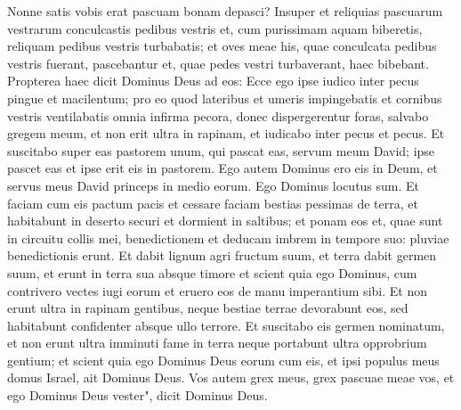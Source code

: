 \begin{biblechapter}
\verse Nonne satis vobis erat pascuam bonam depasci? Insuper et reliquias pascuarum vestrarum conculcastis pedibus vestris et, cum purissimam aquam biberetis, reliquam pedibus vestris turbabatis; 
\verse et oves meae his, quae conculcata pedibus vestris fuerant, pascebantur et, quae pedes vestri turbaverant, haec bibebant. 
\verse Propterea haec dicit Dominus Deus ad eos: Ecce ego ipse iudico inter pecus pingue et macilentum; 
\verse pro eo quod lateribus et umeris impingebatis et cornibus vestris ventilabatis omnia infirma pecora, donec dispergerentur foras, 
\verse salvabo gregem meum, et non erit ultra in rapinam, et iudicabo inter pecus et pecus. 
\verse Et suscitabo super eas pastorem unum, qui pascat eas, servum meum David; ipse pascet eas et ipse erit eis in pastorem. 
\verse Ego autem Dominus ero eis in Deum, et servus meus David princeps in medio eorum. Ego Dominus locutus sum. 
\verse Et faciam cum eis pactum pacis et cessare faciam bestias pessimas de terra, et habitabunt in deserto securi et dormient in saltibus; 
\verse et ponam eos et, quae sunt in circuitu collis mei, benedictionem et deducam imbrem in tempore suo: pluviae benedictionis erunt.  
\verse Et dabit lignum agri fructum suum, et terra dabit germen suum, et erunt in terra sua absque timore et scient quia ego Dominus, cum contrivero vectes iugi eorum et eruero eos de manu imperantium sibi. 
\verse Et non erunt ultra in rapinam gentibus, neque bestiae terrae devorabunt eos, sed habitabunt confidenter absque ullo terrore. 
\verse Et suscitabo eis germen nominatum, et non erunt ultra imminuti fame in terra neque portabunt ultra opprobrium gentium;  
\verse et scient quia ego Dominus Deus eorum cum eis, et ipsi populus meus domus Israel, ait Dominus Deus. 
\verse Vos autem grex meus, grex pascuae meae vos, et ego Dominus Deus vester", dicit Dominus Deus. 
\end{biblechapter}

